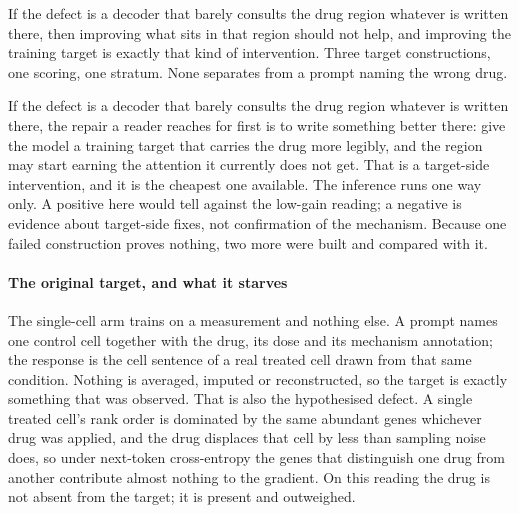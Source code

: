 
\begin{question}[4]
If the defect is a decoder that barely consults the drug region whatever is
written there, then improving what sits in that region should not help, and
improving the training target is exactly that kind of intervention. Three
target constructions, one scoring, one stratum. None separates from a prompt
naming the wrong drug.
\end{question}

\noindent
If the defect
is a decoder that barely consults the drug region whatever is written there, the
repair a reader reaches for first is to write something better there: give the
model a training target that carries the drug more legibly, and the region may
start earning the attention it currently does not get. That is a target-side
intervention, and it is the cheapest one available. The inference runs one way
only. A positive here would tell against the low-gain reading; a negative is
evidence about target-side fixes, not confirmation of the mechanism. Because one
failed construction proves nothing, two more were built and compared with it.

\paragraph{The original target, and what it starves} The single-cell arm trains
on a measurement and nothing else. A prompt names one control cell together with
the drug, its dose and its mechanism annotation; the response is the cell
sentence of a real treated cell drawn from that same condition. Nothing is
averaged, imputed or reconstructed, so the target is exactly something that was
observed. That is also the hypothesised defect. A single treated cell's rank
order is dominated by the same abundant genes whichever drug was applied, and the
drug displaces that cell by less than sampling noise does, so under next-token
cross-entropy the genes that distinguish one drug from another contribute almost
nothing to the gradient. On this reading the drug is not absent from the target;
it is present and outweighed.

